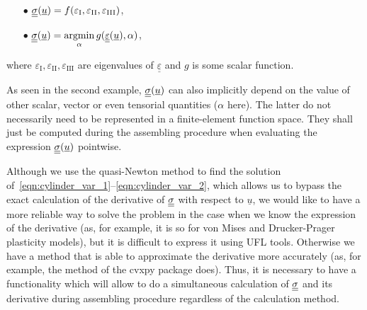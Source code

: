 \documentclass[12pt]{article}
\begin{document}
\begin{itemize}
    \item[$\bullet$] $\underline{\underline{\sigma}}(\underline{u}) = f(\varepsilon_\text{I}, \varepsilon_\text{II}, \varepsilon_\text{III})$,
    \item[$\bullet$] $\underline{\underline{\sigma}}(\underline{u}) = \underset{\alpha}{\operatorname{argmin}}\, g(\underline{\underline{\varepsilon}}(\underline{u}),  \alpha)$,
\end{itemize}
where $\varepsilon_\text{I}, \varepsilon_\text{II}, \varepsilon_\text{III}$ are eigenvalues of $\underline{\underline{\varepsilon}}$ and $g$ is some scalar function.




As seen in the second example, $\underline{\underline{\sigma}}(\underline{u})$ can also implicitly depend on the value of other scalar, vector or even tensorial quantities ($\alpha$ here). The latter do not necessarily need to be represented in a finite-element function space. They shall just be computed during the assembling procedure when evaluating the expression $\underline{\underline{\sigma}}(\underline{u})$ pointwise.

Although we use the quasi-Newton method to find the solution of~\eqref{eqn:cylinder_var_1}--\eqref{eqn:cylinder_var_2}, which allows us to bypass the exact calculation of the derivative of $\underline{\underline{\sigma}}$ with respect to $\underline{u}$, we would like to have a more reliable way to solve the problem in the case when we know the expression of the derivative (as, for example, it is so for von Mises and Drucker-Prager plasticity models), but it is difficult to express it using UFL tools. Otherwise we have a method that is able to approximate the derivative more accurately (as, for example, the  method of the cvxpy package does). Thus, it is necessary to have a functionality which will allow to do a simultaneous calculation of $\underline{\underline{\sigma}}$ and its derivative during assembling procedure regardless of the calculation method.
\end{document}

